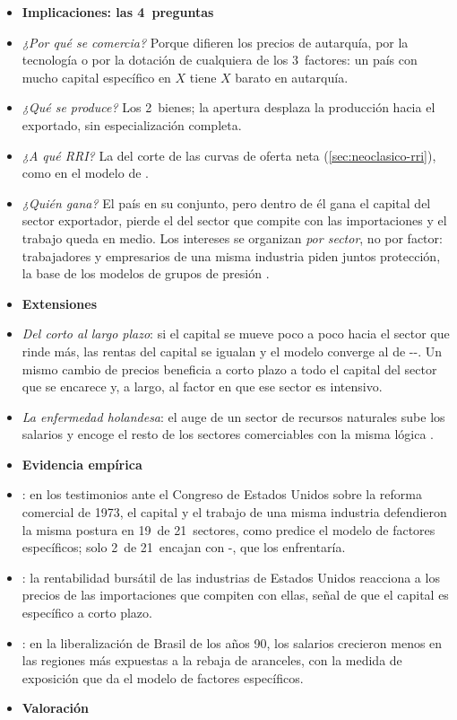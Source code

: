 \documentclass[11pt]{article}
\begin{document}
\begin{itemize}
\item[] \textbf{Implicaciones: las 4~preguntas}

\item \emph{¿Por qué se comercia?} Porque difieren los precios de autarquía, por la tecnología o por la dotación de cualquiera de los 3~factores: un país con mucho capital específico en $X$ tiene $X$ barato en autarquía.
\item \emph{¿Qué se produce?} Los 2~bienes; la apertura desplaza la producción hacia el exportado, sin especialización completa.
\item \emph{¿A qué RRI?} La del corte de las curvas de oferta neta (\ref{sec:neoclasico-rri}), como en el modelo de .
\item \emph{¿Quién gana?} El país en su conjunto, pero dentro de él gana el capital del sector exportador, pierde el del sector que compite con las importaciones y el trabajo queda en medio. Los intereses se organizan \emph{por sector}, no por factor: trabajadores y empresarios de una misma industria piden juntos protección, la base de los modelos de grupos de presión .
\item[] \textbf{Extensiones}

\item \emph{Del corto al largo plazo}: si el capital se mueve poco a poco hacia el sector que rinde más, las rentas del capital se igualan y el modelo converge al de --. Un mismo cambio de precios beneficia a corto plazo a todo el capital del sector que se encarece y, a largo, al factor en que ese sector es intensivo\nocite{Mussa1974Tariffs,Neary1978Short}.
\item \emph{La enfermedad holandesa}: el auge de un sector de recursos naturales sube los salarios y encoge el resto de los sectores comerciables con la misma lógica\nocite{CordenNeary1982} .
\item[] \textbf{Evidencia empírica}

\item \textcite{Magee1980Three}: en los testimonios ante el Congreso de Estados Unidos sobre la reforma comercial de 1973, el capital y el trabajo de una misma industria defendieron la misma postura en 19~de 21~sectores, como predice el modelo de factores específicos; solo 2~de 21~encajan con -, que los enfrentaría\nocite{MageeDavidsonMatusz2005Trade}.
\item \textcite{GrossmanLevinsohn1989Import}: la rentabilidad bursátil de las industrias de Estados Unidos reacciona a los precios de las importaciones que compiten con ellas, señal de que el capital es específico a corto plazo.
\item \textcite{Kovak2013Regional}: en la liberalización de Brasil de los años 90, los salarios crecieron menos en las regiones más expuestas a la rebaja de aranceles, con la medida de exposición que da el modelo de factores específicos.
\item[] \textbf{Valoración}


\end{itemize}
\end{document}
